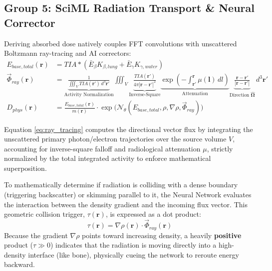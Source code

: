 \documentclass[11pt,a4paper]{article}
\begin{document}
\subsection{Group 5: SciML Radiation Transport \& Neural Corrector}
Deriving absorbed dose natively couples FFT convolutions with unscattered Boltzmann ray-tracing and AI correctors:
\begin{align}
    E_{base,total}(\mathbf{r}) &= TIA \ast (\bar{E}_{\beta} K_{\beta,lung} + \bar{E}_{\gamma} K_{\gamma,water}) \\
    \vec{\Phi}_{ray}(\mathbf{r}) &= \underbrace{\frac{1}{\iiint_V TIA(\mathbf{r}') \, d^3\mathbf{r}'}}_{\text{Activity Normalization}} \iiint_{V} \underbrace{\frac{TIA(\mathbf{r}')}{4\pi |\mathbf{r} - \mathbf{r}'|^2}}_{\text{Inverse-Square}} \underbrace{\exp\left( -\int_{\mathbf{r}'}^{\mathbf{r}} \mu(\mathbf{l}) \, dl \right)}_{\text{Attenuation}} \underbrace{\frac{\mathbf{r} - \mathbf{r}'}{|\mathbf{r} - \mathbf{r}'|}}_{\text{Direction } \mathbf{\hat{\Omega}}} \, d^3\mathbf{r}' \label{eq:ray_tracing} \\
    D_{phys}(\mathbf{r}) &= \frac{E_{base,total}(\mathbf{r})}{m(\mathbf{r})} \cdot \exp\Big(\mathcal{N}_\theta(E_{base,total}, \rho, \nabla\rho, \vec{\Phi}_{ray})\Big)
\end{align}

Equation \ref{eq:ray_tracing} computes the directional vector flux by integrating the unscattered primary photon/electron trajectories over the source volume $V$, accounting for inverse-square falloff and radiological attenuation $\mu$, strictly normalized by the total integrated activity to enforce mathematical superposition. 

To mathematically determine if radiation is colliding with a dense boundary (triggering backscatter) or skimming parallel to it, the Neural Network evaluates the interaction between the density gradient and the incoming flux vector. This geometric collision trigger, $\tau(\mathbf{r})$, is expressed as a dot product:
\begin{equation}
    \tau(\mathbf{r}) = \nabla\rho(\mathbf{r}) \cdot \vec{\Phi}_{ray}(\mathbf{r})
\end{equation}
Because the gradient $\nabla\rho$ points toward increasing density, a heavily \textbf{positive} product ($\tau \gg 0$) indicates that the radiation is moving directly into a high-density interface (like bone), physically cueing the network to reroute energy backward.
\end{document}
